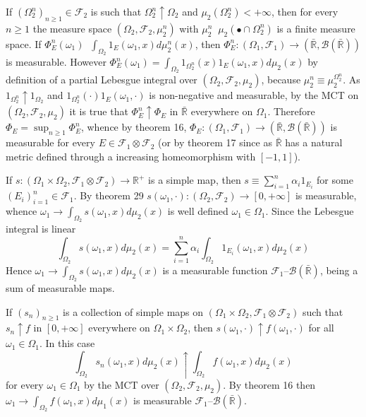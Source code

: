 \documentclass[a4paper]{article}
\newcommand{\clo}[1]{\left [ #1 \right ]}
\newcommand{\brac}[1]{\left ( #1 \right )}
\newcommand{\Rbar}{{\bar{\mathbb{R}}}}
\newcommand{\Real}{\mathbb{R}}
\newcommand{\Zinf}{\clo{ 0, +\infty }}
\newcommand{\Fcal}{\mathcal{F}}
\newcommand{\borel}[1]{\mathcal{B}\brac{#1}}
\newcommand{\defn}{\mathop{\overset{\Delta}{=}}\nolimits}
\begin{document}
If $\brac{\Omega_2^n}_{n\geq 1}\in \Fcal_2$ is such that $\Omega_2^n \uparrow \Omega_2$ and $\mu_2\brac{\Omega_2^n}<+\infty$, then for every $n\geq 1$ the measure space $\brac{\Omega_2, \Fcal_2, \mu_2^n}$ with $\mu_2^n \defn \mu_2\brac{\bullet \cap \Omega_2^n}$ is a finite measure space. If $\Phi_E^n\brac{\omega_1}\defn \int_{\Omega_2} 1_E\brac{\omega_1, x} d\mu_2^n\brac{x}$, then $\Phi_E^n:\brac{\Omega_1, \Fcal_1}\to\brac{\Rbar, \borel{\Rbar}}$ is measurable. However $\Phi_E^n\brac{\omega_1} = \int_{\Omega_2} 1_{\Omega_2^n}\brac{x}1_E\brac{\omega_1, x} d\mu_2\brac{x}$ by definition of a partial Lebesgue integral over $\brac{\Omega_2, \Fcal_2, \mu_2}$, because $\mu_2^n \equiv \mu_2^{\Omega_2^n}$. As $1_{\Omega_2^n} \uparrow 1_{\Omega_2}$ and $1_{\Omega_2^n}\brac{\cdot} 1_E\brac{\omega_1, \cdot}$ is non-negative and measurable, by the MCT on $\brac{\Omega_2, \Fcal_2, \mu_2}$ it is true that $\Phi_E^n \uparrow \Phi_E$ in $\Rbar$ everywhere on $\Omega_1$. Therefore $\Phi_E = \sup_{n\geq 1} \Phi_E^n$, whence by theorem 16, $\Phi_E:\brac{\Omega_1, \Fcal_1}\to \brac{\Rbar, \borel{\Rbar}}$ is measurable for every $E\in \Fcal_1\otimes \Fcal_2$ (or by theorem 17 since as $\Rbar$ has a natural metric defined through a increasing homeomorphism with $\clo{-1,1}$).

If $s:\brac{\Omega_1\times \Omega_2, \Fcal_1\otimes \Fcal_2}\to \Real^+$ is a simple map, then $s\equiv \sum_{i=1}^n \alpha_i 1_{E_i}$ for some $\brac{E_i}_{i=1}^n\in \Fcal_1$. By theorem 29 $s\brac{\omega_1, \cdot}:\brac{\Omega_2, \Fcal_2}\to \Zinf$ is measurable, whence $\omega_1\to\int_{\Omega_2} s\brac{\omega_1, x}d\mu_2\brac{x}$ is well defined $\omega_1\in \Omega_1$. Since the Lebesgue integral is linear \[\int_{\Omega_2} s\brac{\omega_1, x}d\mu_2\brac{x} = \sum_{i=1}^n \alpha_i \int_{\Omega_2} 1_{E_i}\brac{\omega_1, x}d\mu_2\brac{x}\] Hence $\omega_1\to\int_{\Omega_2} s\brac{\omega_1, x}d\mu_2\brac{x}$ is a measurable function $\Fcal_1$--$\borel{\Rbar}$, being a sum of measurable maps.

If $\brac{s_n}_{n\geq 1}$ is a collection of simple maps on $\brac{\Omega_1\times \Omega_2, \Fcal_1\otimes \Fcal_2}$ such that $s_n\uparrow f$ in $\Zinf$ everywhere on $\Omega_1\times \Omega_2$, then $s\brac{\omega_1, \cdot}\uparrow f\brac{\omega_1, \cdot}$ for all $\omega_1\in \Omega_1$. In this case \[\int_{\Omega_2} s_n\brac{\omega_1, x} d\mu_2\brac{x} \uparrow \int_{\Omega_2} f\brac{\omega_1, x} d\mu_2\brac{x}\] for every $\omega_1\in \Omega_1$ by the MCT over $\brac{\Omega_2, \Fcal_2, \mu_2}$. By theorem 16 then $\omega_1\to\int_{\Omega_2} f\brac{\omega_1, x}d\mu_1\brac{x}$ is measurable $\Fcal_1$--$\borel{\Rbar}$.
\end{document}
